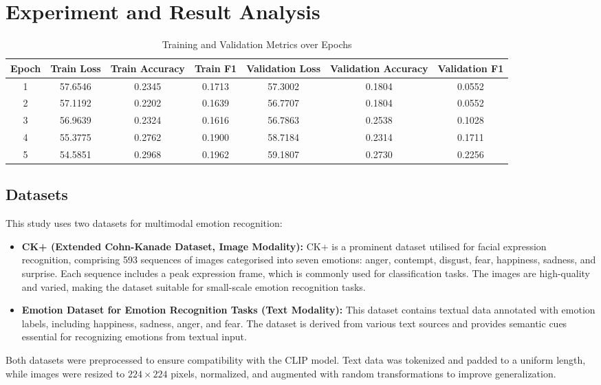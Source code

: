 \documentclass{article}
\theoremstyle{plain}
\theoremstyle{definition}
\theoremstyle{remark}
\begin{document}
\section{Experiment and Result Analysis}
\begin{table*}[t]  %
\centering
\caption{Training and Validation Metrics over Epochs}
\label{table:1}
\begin{tabular}{|c|c|c|c|c|c|c|}
\hline
Epoch & Train Loss & Train Accuracy & Train F1 & Validation Loss & Validation Accuracy & Validation F1 \\
\hline
1 & 57.6546 & 0.2345 & 0.1713 & 57.3002 & 0.1804 & 0.0552 \\
2 & 57.1192 & 0.2202 & 0.1639 & 56.7707 & 0.1804 & 0.0552 \\
3 & 56.9639 & 0.2324 & 0.1616 & 56.7863 & 0.2538 & 0.1028 \\
4 & 55.3775 & 0.2762 & 0.1900 & 58.7184 & 0.2314 & 0.1711 \\
5 & 54.5851 & 0.2968 & 0.1962 & 59.1807 & 0.2730 & 0.2256 \\
\hline
\end{tabular}
\end{table*}

\subsection{Datasets}
This study uses two datasets for multimodal emotion recognition:
\begin{itemize}
    \item \textbf{CK+ (Extended Cohn-Kanade Dataset, Image Modality):} CK+ is a prominent dataset utilised for facial expression recognition, comprising 593 sequences of images categorised into seven emotions: anger, contempt, disgust, fear, happiness, sadness, and surprise. Each sequence includes a peak expression frame, which is commonly used for classification tasks. The images are high-quality and varied, making the dataset suitable for small-scale emotion recognition tasks.
    \item \textbf{Emotion Dataset for Emotion Recognition Tasks (Text Modality):} This dataset contains textual data annotated with emotion labels, including happiness, sadness, anger, and fear. The dataset is derived from various text sources and provides semantic cues essential for recognizing emotions from textual input.
\end{itemize}

Both datasets were preprocessed to ensure compatibility with the CLIP model. Text data was tokenized and padded to a uniform length, while images were resized to \(224 \times 224\) pixels, normalized, and augmented with random transformations to improve generalization.
\end{document}
